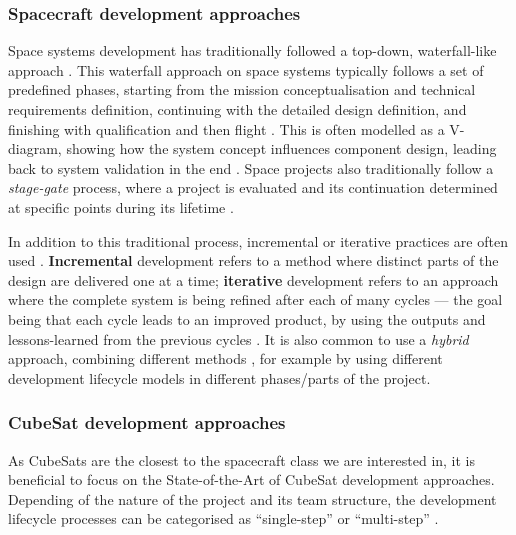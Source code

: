 \documentclass[journal,10pt]{IEEEtran}
\begin{document}
\subsubsection{Spacecraft development approaches}
Space systems development has traditionally followed a top-down, waterfall-like approach \autocite{sheaNASASystemsEngineering2020, ECSS-E-ST-10C}. This waterfall approach on space systems typically follows a set of predefined phases, starting from the mission conceptualisation and technical requirements definition, continuing with the detailed design definition, and finishing with qualification and then flight \autocite{sheaNASASystemsEngineering2020}. This is often modelled as a V-diagram, showing how the system concept influences component design, leading back to system validation in the end \autocite{bundesrepublikdeutschlandVModellXT2006}. Space projects also traditionally follow a \textit{stage-gate} process, where a project is evaluated and its continuation determined at specific points during its lifetime \cite{carsonCanSystemsEngineering2013}.

In addition to this traditional process, incremental or iterative practices are often used \autocite{HEEAGER201822}. \textbf{Incremental} development refers to a method where distinct parts of the design are delivered one at a time; \textbf{iterative} development refers to an approach where the complete system is being refined after each of many cycles --- the goal being that each cycle leads to an improved product, by using the outputs and lessons-learned from the previous cycles \autocite{HEEAGER201822}.
It is also common to use a \textit{hybrid} approach, combining different methods \autocite{carpenterAgileTooFragile2014,garzanitiHybridAgileProduct2020}, for example by using different development lifecycle models in different phases/parts of the project.



\subsubsection{CubeSat development approaches}
\label{sec:approaches}

As CubeSats are the closest to the spacecraft class we are interested in, it is beneficial to focus on the State-of-the-Art of CubeSat development approaches.
Depending of the nature of the project and its team structure, the development lifecycle processes can be categorised as ``single-step'' or ``multi-step'' \autocite{sebok_drivers}.
\end{document}
